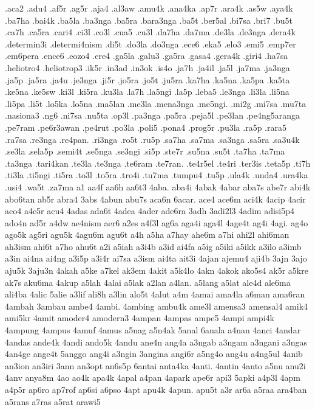 .aca2
.adu4
.af5r
.ag5r
.aja4
.al3aw
.amu4k
.ana4ka
.ap7r
.ara4k
.as5w
.aya4k
.ba7ha
.bai4k
.ba5la
.ba3nga
.ba5ra
.bara3nga
.ba5t
.ber5al
.bi7sa
.bri7
.bu5t
.ca7h
.ca5ra
.cari4
.ci3l
.co3l
.cua5
.cu3l
.da7ha
.da7ma
.de3la
.de3nga
.dera4k
.determin3i
.determi4nism
.di5t
.do3la
.do3nga
.ece6
.eka5
.elo3
.emi5
.emp7er
.em6pera
.ence6
.eozo4
.ere4
.ga5la
.galu3
.ga5ra
.gasa4
.gera4k
.giri4
.ha7sa
.heliotro4
.heliotrop3
.ik5r
.in3ad
.in3ok
.is4o
.ja7h
.ja4il
.ja5l
.ja7ma
.ja3nga
.ja5p
.ja5ra
.ja4u
.je3nga
.ji5r
.jo5ra
.jo5t
.ju5ra
.ka7ha
.ka5na
.ka5pa
.ka5ta
.ke5na
.ke5sw
.ki3l
.ki5ra
.ku3la
.la7h
.la5ngi
.la5p
.leba5
.le3nga
.li3la
.li5na
.li5pa
.li5t
.lo5ka
.lo5na
.ma5lan
.me3la
.mena3nga
.me5ngi.
.mi2g
.mi7sa
.mu7ta
.nasiona3
.ng6
.ni7sa
.nu5ta
.op3l
.pa3nga
.pa5ra
.peja5l
.pe3lan
.pe4ng5aranga
.pe7ram
.pe6r3awan
.pe4rut
.po3la
.poli5
.pona4
.prog5r
.pu3la
.ra5p
.rara5
.ra7sa
.re3nga
.re4pan.
.ri3nga
.ro5t
.ru5p
.sa7ha
.sa7ma
.sa3nga
.sa5ra
.sa3u4k
.se3la
.sela5p
.semi4t
.se5nga
.se3ngi
.si5p
.ste7r
.su5na
.su5t
.ta7ha
.ta7ma
.ta3nga
.tari4kan
.te3la
.te3nga
.te6ram
.te7ran.
.te4r5el
.te4ri
.ter3is
.teta5p
.ti7h
.ti3la
.ti5ngi
.ti5ra
.to3l
.to5ra
.tro4i
.tu7ma
.tumpu4
.tu5p
.ula4k
.unda4
.ura4ka
.usi4
.wa5t
.za7ma
a1
aa4f
aa6h
aa6t3
4aba.
aba4i
4abak
4abar
aba7s
abe7r
abi4k
abo6tan
ab5r
abra4
3abs
4abun
abu7s
aca6n
6acar.
ace4
ace6m
aci4k
4acip
4acir
aco4
a4c5r
acu4
4adas
ada6t
4adea
4ader
ade6ra
3adh
3adi2l3
4adim
adisi5p4
ado4n
ad5r
a4dw
ae4nism
aer6
a2es
a4f3l
ag6a
aga4i
aga4l
4age4t
ag4i
4agi.
ag4o
ago5k
ag5ri
agu5k
4agu6m
agu6t
a4h
a5ha
a7hay
ahe6m
a7hi
ahi2l
ahi6man
ah3ism
ahi6t
a7ho
ahu6t
a2i
a5iah
a3i4b
a3id
ai4fa
a5ig
a5iki
a5ikk
a3ilo
a3imb
a3in
ai4na
ai4ng
a3i5p
a3i4r
ai7sa
a3ism
ai4ta
ait3i
4ajan
ajemu4
aji4b
3ajn
3ajo
aju5k
3aju3n
4akah
a5ke
a7kel
ak3em
4akit
a5k4lo
4akn
4akok
ako5s4
ak5r
a5kre
ak7s
aku6ma
4akup
a5lah
4alai
a5lak
a2lan
a4lan.
a5lang
a5lat
ale4d
ale6ma
ali4ba
4alic
5alie
a3lif
ali8h
a3lin
alo5t
4alut
a4m
4amai
ama4la
a6man
ama6ran
4ambah
3ambau
ambe4
4ambi.
4ambing
ambu4k
ame3l
amensa3
amensal4
amik4
ami5kr
4amit
amoder4
amodern3
4ampan
4ampas
ampe5
4ampi
ampi4k
4ampung
4ampus
4amuf
4amus
a5nag
a5n4ak
5anal
6anala
a4nan
4anci
4andar
4andas
ande4k
4andi
ando5k
4andu
ane4n
ang4a
a3ngab
a3ngam
a3ngani
a3ngas
4an4ge
ange4t
5anggo
ang4i
a3ngin
3angina
angi6r
a5ng4o
ang4u
a4ng5ul
4anib
an3ion
an3iri
3ann
an3opt
an6s5p
6antai
anta4ka
4anti.
4antin
4anto
a5nu
anu2i
4anv
anya8m
4ao
ao4k
apa4k
4apal
a4pan
4apark
ape6r
api3
5apki
a4p3l
4apm
a4p5r
ap6ro
ap7rof
ap6si
a6pso
4apt
apu4k
4apun.
apu5t
a3r
ar6a
a5raa
ara4ban
a5rans
a7ras
a5rat
arawi5
